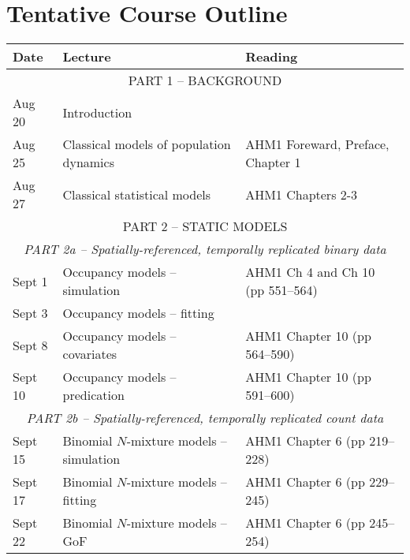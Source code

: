 \documentclass[12pt]{article}
\begin{document}

\section*{\normalsize Tentative Course Outline}
\vspace{-6mm}

\begin{center}
\begin{tabular}[c]{lll}
\hline \hline
{\bf Date} & {\bf Lecture}                                & {\bf Reading}                             \\
\hline
           \multicolumn{3}{c}{PART 1 -- BACKGROUND}                                                   \\
\hline
Aug 20     & Introduction                                 &                                           \\
\hline
Aug 25     & Classical models of population dynamics      & AHM1 Foreward, Preface, Chapter 1         \\
Aug 27     & Classical statistical models                 & AHM1 Chapters 2-3                         \\
\hline
           \multicolumn{3}{c}{PART 2 -- STATIC MODELS}                                                \\
           \multicolumn{3}{c}{\it PART 2a -- Spatially-referenced, temporally replicated binary data} \\
\hline
Sept 1     & Occupancy models -- simulation               & AHM1 Ch 4 and Ch 10 (pp 551--564)         \\
Sept 3     & Occupancy models -- fitting                  &                                           \\
\hline
Sept 8     & Occupancy models -- covariates               & AHM1 Chapter 10 (pp 564--590)             \\
Sept 10    & Occupancy models -- predication              & AHM1 Chapter 10 (pp 591--600)             \\
\hline
           \multicolumn{3}{c}{\it PART 2b -- Spatially-referenced, temporally replicated count data}  \\
\hline
Sept 15    & Binomial $N$-mixture models -- simulation    & AHM1 Chapter 6 (pp 219--228)              \\
Sept 17    & Binomial $N$-mixture models -- fitting       & AHM1 Chapter 6 (pp 229--245)              \\
\hline
Sept 22    & Binomial $N$-mixture models -- GoF           & AHM1 Chapter 6 (pp 245--254)              \\

\end{tabular}
\end{center}
\end{document}
